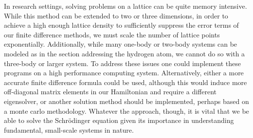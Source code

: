 In research settings, solving problems on a lattice can be quite memory intensive.
While this method can be extended to two or three dimensions, in order to achieve a high enough lattice density to sufficiently suppress the error terms of our finite difference methods, we must scale the number of lattice points exponentially.
Additionally, while many one-body or two-body systems can be modeled as in the section addressing the hydrogen atom, we cannot do so with a three-body or larger system.
To address these issues one could implement these programs on a high performance computing system.
Alternatively, either a more accurate finite difference formula could be used, although this would induce more off-diagonal matrix elements in our Hamiltonian and require a different eigensolver, or another solution method should be implemented, perhaps based on a monte carlo methodology.
Whatever the approach, though, it is vital that we be able to solve the Schr\"{o}dinger equation given its importance in understanding fundamental, small-scale systems in nature.

    

